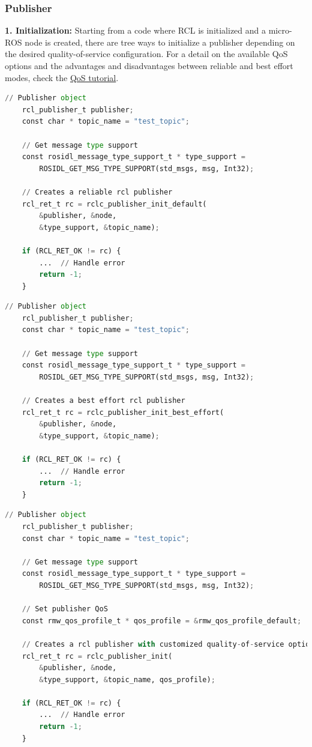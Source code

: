 \subsubsection{Publisher}
\textbf{1. Initialization:} Starting from a code where RCL is initialized and a micro-ROS node is created, there are tree ways to initialize a publisher depending on the desired quality-of-service configuration. For a detail on the available QoS options and the advantages and disadvantages between reliable and best effort modes, check the \href{https://micro.ros.org/docs/tutorials/programming_rcl_rclc/qos/}{QoS tutorial}.

\begin{lstlisting}[language=Python, caption=Reliable (default)]
    // Publisher object
    rcl_publisher_t publisher;
    const char * topic_name = "test_topic";
    
    // Get message type support
    const rosidl_message_type_support_t * type_support =
        ROSIDL_GET_MSG_TYPE_SUPPORT(std_msgs, msg, Int32);
    
    // Creates a reliable rcl publisher
    rcl_ret_t rc = rclc_publisher_init_default(
        &publisher, &node,
        &type_support, &topic_name);
    
    if (RCL_RET_OK != rc) {
        ...  // Handle error
        return -1;
    }
\end{lstlisting}

\begin{lstlisting}[language=Python, caption=Best effort]
    // Publisher object
    rcl_publisher_t publisher;
    const char * topic_name = "test_topic";
    
    // Get message type support
    const rosidl_message_type_support_t * type_support =
        ROSIDL_GET_MSG_TYPE_SUPPORT(std_msgs, msg, Int32);
    
    // Creates a best effort rcl publisher
    rcl_ret_t rc = rclc_publisher_init_best_effort(
        &publisher, &node,
        &type_support, &topic_name);
    
    if (RCL_RET_OK != rc) {
        ...  // Handle error
        return -1;
    }
\end{lstlisting}

\begin{lstlisting}[language=Python, caption=Custom QoS]
    // Publisher object
    rcl_publisher_t publisher;
    const char * topic_name = "test_topic";
    
    // Get message type support
    const rosidl_message_type_support_t * type_support =
        ROSIDL_GET_MSG_TYPE_SUPPORT(std_msgs, msg, Int32);
    
    // Set publisher QoS
    const rmw_qos_profile_t * qos_profile = &rmw_qos_profile_default;
    
    // Creates a rcl publisher with customized quality-of-service options
    rcl_ret_t rc = rclc_publisher_init(
        &publisher, &node,
        &type_support, &topic_name, qos_profile);
    
    if (RCL_RET_OK != rc) {
        ...  // Handle error
        return -1;
    }
\end{lstlisting}

